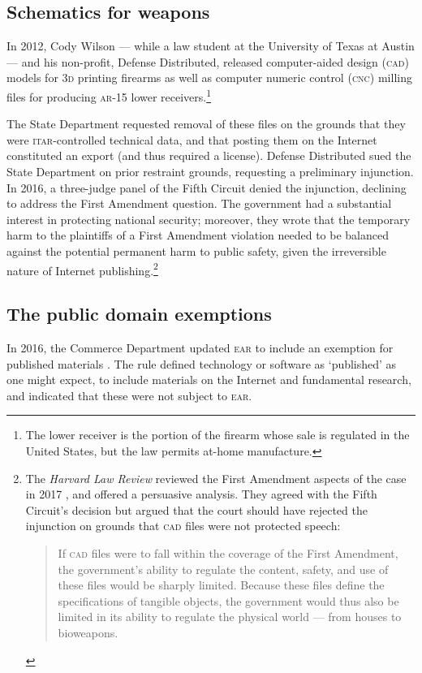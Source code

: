 \documentclass[preprint,twocolumn,5p]{elsarticle}
\begin{document}
\subsection{Schematics for weapons}
In 2012, Cody Wilson --- while a law student at the University of Texas at Austin --- and his non-profit, Defense Distributed, released computer-aided design (\textsc{cad}) models for \textsc{3d} printing firearms as well as computer numeric control (\textsc{cnc}) milling files for producing \textsc{ar}-15 lower receivers.\footnote{The lower receiver is the portion of the firearm whose sale is regulated in the United States, but the law permits at-home manufacture.}

The State Department requested removal of these files on the grounds that they were \textsc{itar}-controlled technical data, and that posting them on the Internet constituted an export (and thus required a license). Defense Distributed sued the State Department on prior restraint grounds, requesting a preliminary injunction. In 2016, a three-judge panel of the Fifth Circuit denied the injunction, declining to address the First Amendment question. The government had a substantial interest in protecting national security; moreover, they wrote that the temporary harm to the plaintiffs of a First Amendment violation needed to be balanced against the potential permanent harm to public safety, given the irreversible nature of Internet publishing.\footnote{The \textit{Harvard Law Review} reviewed the First Amendment aspects of the  case in 2017 \citep{Harvard2017}, and offered a persuasive analysis. They agreed with the Fifth Circuit's decision but argued that the court should have rejected the injunction on grounds that \textsc{cad} files were not protected speech:
\begin{quote}
If \textsc{cad} files were to fall within the coverage of the First Amendment, the government's ability to regulate the content, safety, and use of these files would be sharply limited. Because these files define the specifications of tangible objects, the government would thus also be limited in its ability to regulate the physical world --- from houses to bioweapons.
\end{quote}} \citep{DefenseDistributed2016}

\subsection{The public domain exemptions}
In 2016, the Commerce Department updated \textsc{ear} to include an exemption for published materials \citep{PublishedRule2016}. The rule defined technology or software as `published' as one might expect, to include materials on the Internet and fundamental research, and indicated that these were not subject to \textsc{ear}.
\end{document}
